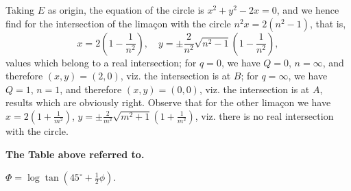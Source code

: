 \documentclass[11pt,a4paper]{book}
\begin{document}
Taking $E$ as origin, the equation of the circle is $x^2 + y^2 - 2x = 0$, and we hence find for the intersection of the lima\c{c}on with the circle $n^2x = 2(n^2 - 1)$, that is,
\[
x = 2\left(1 - \frac{1}{n^2}\right), \quad y = \pm\frac{2}{n^2}\sqrt{n^2 - 1}\left(1 - \frac{1}{n^2}\right),
\]
values which belong to a real intersection; for $q = 0$, we have $Q = 0$, $n = \infty$, and therefore $(x,y) = (2,0)$, viz. the intersection is at $B$; for $q = \infty$, we have $Q = 1$, $n = 1$, and therefore $(x,y) = (0,0)$, viz. the intersection is at $A$, results which are obviously right. Observe that for the other lima\c{c}on we have $x = 2(1 + \frac{1}{m^2})$, $y = \pm\frac{2}{m^2}\sqrt{m^2 + 1}(1 + \frac{1}{m^2})$, viz. there is no real intersection with the circle.

\bigskip

\begin{center}
\textbf{The Table above referred to.}

\smallskip
$\Phi = \log \tan(45^\circ + \frac{1}{2}\phi)$.
\end{center}

\medskip
\end{document}
